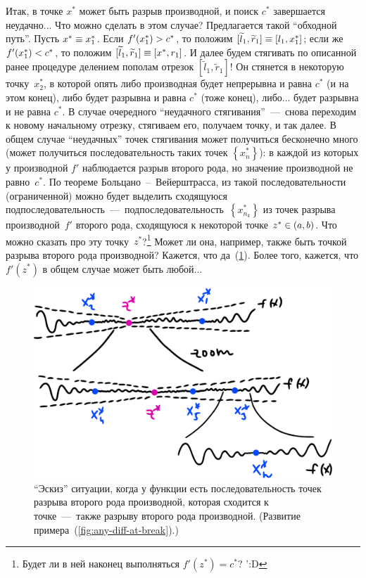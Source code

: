 \documentclass[a4paper,12pt]{article}
\begin{document}
  Итак, в точке $x^*$ может быть разрыв производной, и поиск $c^*$ завершается неудачно...
  Что можно сделать в этом случае?
  Предлагается такой ``обходной путь''.
  Пусть $x^* \hm\equiv x^*_1$.
  Если $f'(x^*_1) \hm> c^*$, то положим $[\widetilde l_1, \widetilde r_1] \hm\equiv [l_1, x^*_1]$; если же $f'(x^*_1) \hm< c^*$, то положим $[\widetilde l_1, \widetilde r_1] \hm\equiv [x^*, r_1]$.  %
  И далее будем стягивать по описанной ранее процедуре делением пополам отрезок $[\widetilde l_1, \widetilde r_1]$!
  Он стянется в некоторую точку~$x^*_2$, в которой опять либо производная будет непрерывна и равна $c^*$ (и на этом конец), либо будет разрывна и равна $c^*$ (тоже конец), либо... будет разрывна и не равна $c^*$.
  В случае очередного ``неудачного стягивания''~---~снова переходим к новому начальному отрезку, стягиваем его, получаем точку, и так далее.
  В общем случае ``неудачных'' точек стягивания может получиться бесконечно много (может получиться последовательность таких точек $\left\{x^*_n\right\}$): в каждой из которых у производной $f'$ наблюдается разрыв второго рода, но значение производной не равно~$c^*$.
  По теореме Больцано~--~Вейерштрасса, из такой последовательности (ограниченной) можно будет выделить сходящуюся подпоследовательность~---~подпоследовательность~$\left\{x^*_{n_k}\right\}$ из точек разрыва производной~$f'$ второго рода, сходящуюся к некоторой точке $z^* \hm\in (a, b)$.
  Что можно сказать про эту точку~$z^*$?\footnote{
    Будет ли в ней наконец выполняться $f'(z^*) = c^*$? ':D  %
  }
  Может ли она, например, также быть точкой разрыва второго рода производной?
  Кажется, что да~(\ref{fig:func-with-accumulation-break-diff-point}).
  Более того, кажется, что $f'(z^*)$ в общем случае может быть любой...

  \begin{figure}[ht]
      \centering
      
      \includegraphics[width=0.8\linewidth]{func-with-accumulation-break-diff-point}
      
      \caption{``Эскиз'' ситуации, когда у функции есть последовательность точек разрыва второго рода производной, которая сходится к точке~---~также разрыву второго рода производной.
      (Развитие примера~(\ref{fig:any-diff-at-break}).)}
      \label{fig:func-with-accumulation-break-diff-point}
  \end{figure}
\end{document}
